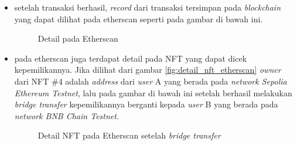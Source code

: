 \begin{itemize}
    \item setelah transaksi berhasil, \emph{record} dari transaksi tersimpan pada \emph{blockchain} yang dapat dilihat pada etherscan seperti pada gambar di bawah ini.

    \begin{figure} [H] \centering
    \caption{Detail pada Etherscan}
    \label{fig:detail_etherscan}
    \end{figure}

    \item pada etherscan juga terdapat detail pada NFT yang dapat dicek kepemilikannya. Jika dilihat dari gambar \ref{fig:detail_nft_etherscan} \emph{owner} dari NFT \#4 adalah \emph{address} dari \emph{user} A yang berada pada \emph{network Sepolia Ethereum Testnet}, lalu pada gambar di bawah ini setelah berhasil melakukan \emph{bridge transfer} kepemilikannya berganti kepada \emph{user} B yang berada pada \emph{network BNB Chain Testnet}.

    \begin{figure} [H] \centering
    \caption{Detail NFT pada Etherscan setelah \emph{bridge transfer}}
    \label{fig:nft_bridge_transfer}
    \end{figure}


\end{itemize}
